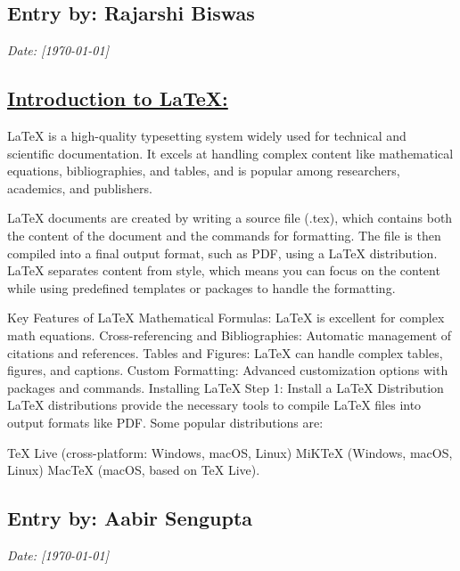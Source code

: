 \documentclass[a4paper,12pt]{article}
\begin{document}
\subsection*{Entry by: Rajarshi Biswas}
\textit{Date: [\today]}\\
\vspace{1 cm}
\begin{flushleft}
\section*{\underline{Introduction to LaTeX:}}
\par
\Large{LaTeX is a high-quality typesetting system widely used for technical and scientific documentation. It excels at handling complex content like mathematical equations, bibliographies, and tables, and is popular among researchers, academics, and publishers.

LaTeX documents are created by writing a source file (.tex), which contains both the content of the document and the commands for formatting. The file is then compiled into a final output format, such as PDF, using a LaTeX distribution. LaTeX separates content from style, which means you can focus on the content while using predefined templates or packages to handle the formatting.

Key Features of LaTeX
Mathematical Formulas: LaTeX is excellent for complex math equations.
Cross-referencing and Bibliographies: Automatic management of citations and references.
Tables and Figures: LaTeX can handle complex tables, figures, and captions.
Custom Formatting: Advanced customization options with packages and commands.
Installing LaTeX
Step 1: Install a LaTeX Distribution
LaTeX distributions provide the necessary tools to compile LaTeX files into output formats like PDF. Some popular distributions are:

TeX Live (cross-platform: Windows, macOS, Linux)
MiKTeX (Windows, macOS, Linux)
MacTeX (macOS, based on TeX Live).}
\end{flushleft}

\newpage
{}
\vspace{-2cm}
\subsection*{Entry by: Aabir Sengupta}
\textit{Date: [\today]}\\
\end{document}
